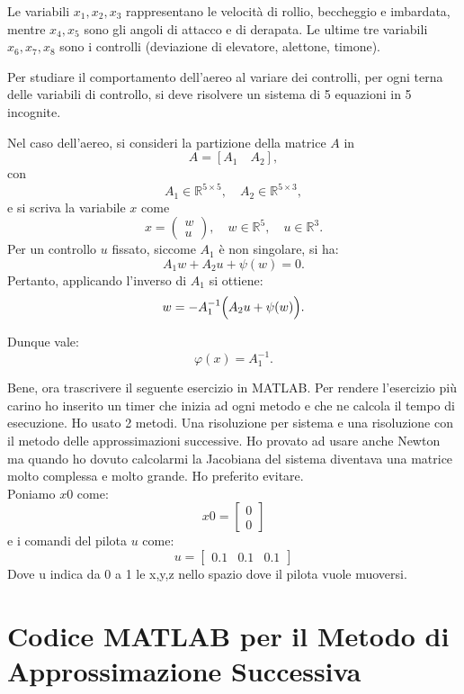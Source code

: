 \documentclass[11pt]{article}
\begin{document}
Le variabili \( x_1, x_2, x_3 \) rappresentano le velocità di rollio, beccheggio e imbardata, mentre \( x_4, x_5 \) sono gli angoli di attacco e di derapata. Le ultime tre variabili \( x_6, x_7, x_8 \) sono i controlli (deviazione di elevatore, alettone, timone).

Per studiare il comportamento dell’aereo al variare dei controlli, per ogni terna delle variabili di controllo, si deve risolvere un sistema di 5 equazioni in 5 incognite.

Nel caso dell’aereo, si consideri la partizione della matrice \( A \) in
\[
A = [A_1 \quad A_2],
\]
con
\[
A_1 \in \mathbb{R}^{5\times5},\quad A_2 \in \mathbb{R}^{5\times3},
\]
e si scriva la variabile \( x \) come
\[
x = \begin{pmatrix} w \\ u \end{pmatrix},\quad w \in \mathbb{R}^{5},\quad u \in \mathbb{R}^{3}.
\]
Per un controllo \( u \) fissato, siccome \( A_1 \) è non singolare, si ha:
\begin{equation*}
  A_1 w + A_2 u + \psi(w) = 0.
\end{equation*}
Pertanto, applicando l'inverso di \( A_1 \) si ottiene:
\begin{equation*}
  w = -A_1^{-1} \Bigl( A_2 u + \psi(w) \Bigr).
\end{equation*}

Dunque vale:
\[
\varphi(x) = A_1^{-1}.
\]

Bene, ora trascrivere il seguente esercizio in MATLAB. Per rendere l'esercizio più carino ho inserito un timer che inizia ad ogni metodo e che ne calcola il tempo di esecuzione. Ho usato 2 metodi. Una risoluzione per sistema e una risoluzione con il metodo delle approssimazioni successive. Ho provato ad usare anche Newton ma quando ho dovuto calcolarmi la Jacobiana del sistema diventava una matrice molto complessa e molto grande. Ho preferito evitare. \\
Poniamo $x0$ come:
\[
x0=\begin{bmatrix}
	0\\0
\end{bmatrix}
\] 
e i comandi del pilota $u$ come:
\[
u=\begin{bmatrix}
	0.1 &0.1 &0.1
\end{bmatrix}
\]
Dove u indica da 0 a 1 le x,y,z nello spazio dove il pilota vuole muoversi.

\section*{Codice MATLAB per il Metodo di Approssimazione Successiva}
\end{document}
